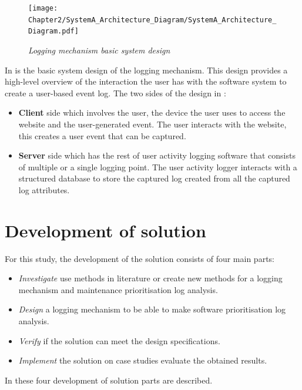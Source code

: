  \begin{figure}[!htb]
	 \centering %
	 \texttt{[image: Chapter2/SystemA\_Architecture\_Diagram/SystemA\_Architecture\_Diagram.pdf]}
	 \caption[Logging mechanism basic system design]
	 {\textit{Logging mechanism basic system design}}\label{fig:ch2_systemDesign}
 \end{figure}
 
 In  is the basic system design of the logging mechanism. This design provides a high-level overview of the interaction the user has with the software system to create a user-based event log. The two sides of the design in :
 
 \begin{itemize}
	 \item \textbf{Client} side which involves the user, the device the user uses to access the website and the user-generated event. The user interacts with the website, this creates a user event that can be captured. 
	 \item \textbf{Server} side which has the rest of user activity logging software that consists of multiple or a single logging point. The user activity logger interacts with a structured database to store the captured log created from all the captured log attributes.
 \end{itemize}
 \clearpage

\section{Development of solution}\label{sec:ch2_developementOfSolution}
For this study, the development of the solution consists of four main parts:

\begin{itemize}
	\item \textit{Investigate} use methods in literature or create new methods for a logging mechanism and maintenance prioritisation log analysis.
	\item \textit{Design} a logging mechanism to be able to make software prioritisation log analysis.
	\item \textit{Verify} if the solution can meet the design specifications.
	\item \textit{Implement} the solution on case studies evaluate the obtained results.
\end{itemize}

In  these four development of solution parts are described.

